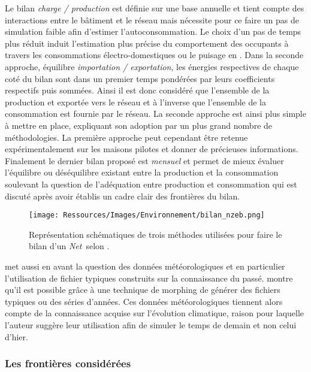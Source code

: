 Le bilan \textit{charge / production} est définie sur une base annuelle
et tient compte des interactions entre le bâtiment et le réseau mais nécessite pour
ce faire un pas de simulation faible afin d’estimer l’autoconsommation.
Le choix d’un pas de temps plus réduit induit l’estimation plus précise du comportement
des occupants à travers les consommations électro-domestiques ou le puisage en .
Dans la seconde approche, équilibre \textit{importation / exportation}, les énergies respectives
de chaque coté du bilan sont dans un premier temps pondérées par leurs coefficients
respectifs puis sommées. Ainsi il est donc considéré que l’ensemble de la production et exportée vers le réseau
et à l’inverse que l’ensemble de la consommation est fournie par le réseau. La seconde approche est ainsi plus
simple à mettre en place, expliquant son adoption par un plus grand nombre de méthodologies.
La première approche peut cependant être retenue expérimentalement sur les maisons pilotes
et donner de précieuses informations. Finalement le dernier bilan proposé est \textit{mensuel} et
permet de mieux évaluer l’équilibre ou déséquilibre existant entre la production et la
consommation soulevant la question de l’adéquation entre production et consommation
qui est discuté après avoir établis un cadre clair des frontières du bilan.
\begin{figure}
    \centering
    \texttt{[image: Ressources/Images/Environnement/bilan\_nzeb.png]}
    \caption{Représentation schématiques de trois méthodes utilisées pour faire
             le bilan d’un \textit{Net}\, selon \textcite{Sartori2012220}.}
    \label{fig:bilan_zeb}
\end{figure}

\textcite{Sartori2010} met aussi en avant la question des données météorologiques
et en particulier l’utilisation de fichier typiques construits sur la connaissance
du passé. \textcite{Robert2012150} montre qu’il est possible grâce à une technique de morphing
\parencite{Belcher200549} de générer des fichiers typiques ou des séries d’années. Ces
données météorologiques tiennent alors compte de la connaissance acquise sur l’évolution
climatique, raison pour laquelle l’auteur suggère leur utilisation afin de simuler
le temps de demain et non celui d’hier.


\subsubsection{Les frontières considérées} %
\label{ssub:les_frontieres_considerees}
